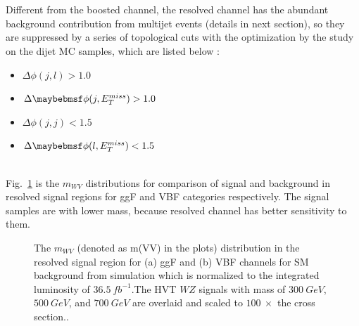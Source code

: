\\
\\Different from the boosted channel, the resolved channel has the abundant background contribution from multijet events (details in next section), so they are suppressed by a series of topological cuts with the optimization by the study on the dijet MC samples, which are listed below \cite{EXOT-2016-28}:
\begin{itemize}
	\item $\Delta\phi(j,l)>1.0$
	\item $\Delta\phi(j,\met)>1.0$
	\item $\Delta\phi(j,j)<1.5$
	\item $\Delta\phi(l,\met)<1.5$
\end{itemize}
\noindent
\\Fig.~\ref{Fig:ResolvedSR} is the $m_{WV}$ distributions for comparison of signal and background in resolved signal regions for ggF and VBF categories respectively. The signal samples are with lower mass, because resolved channel has better sensitivity to them. 
\begin{figure}[h]
	\centering
	\caption{The $m_{WV}$ (denoted as m(VV) in the plots) distribution in the resolved signal region for (a) ggF and (b) VBF channels for SM background from simulation which is normalized to the integrated luminosity of $36.5~fb^{-1}$.The HVT $WZ$ signals with mass of $300~GeV$, $500~GeV$, and $700~GeV$ are overlaid and
		scaled to $100 ~\times$ the cross section..}
	\label{Fig:ResolvedSR}
\end{figure}
